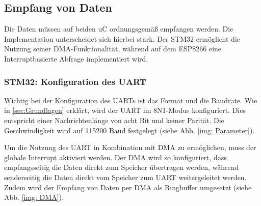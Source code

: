 \subsection{Empfang von Daten}

Die Daten müssen auf beiden \ac{uC} ordnungsgemäß empfangen werden. Die Implementation unterscheidet sich hierbei stark. Der STM32 ermöglicht
die Nutzung seiner \ac{DMA}-Funktionalität, während auf dem ESP8266 eine Interruptbasierte Abfrage implementiert wird.


\subsubsection{STM32: Konfiguration des UART}
Wichtig bei der Konfiguration des \acp{UART} ist das Format und die Baudrate. Wie in \ref{sec:Grundlagen} erklärt, wird der \ac{UART} im 8N1-Modus
konfiguriert. Dies entspricht einer Nachrichtenlänge von acht Bit und keiner Parität. Die Geschwindigkeit wird auf 115200 Baud festgelegt (siehe Abb. \ref{img: Parameter}). 

\smallskip

Um die Nutzung des \ac{UART} in Kombination mit \ac{DMA} zu ermöglichen, muss der globale Interrupt
aktiviert werden. Der \ac{DMA} wird so konfiguriert, dass empfangsseitig die Daten direkt zum Speicher übertragen werden, während senderseitig die Daten
direkt vom Speicher zum \ac{UART} weitergeleitet werden. Zudem wird der Empfang von Daten per \ac{DMA} als Ringbuffer umgesetzt (siehe Abb. \ref{img: DMA}).


